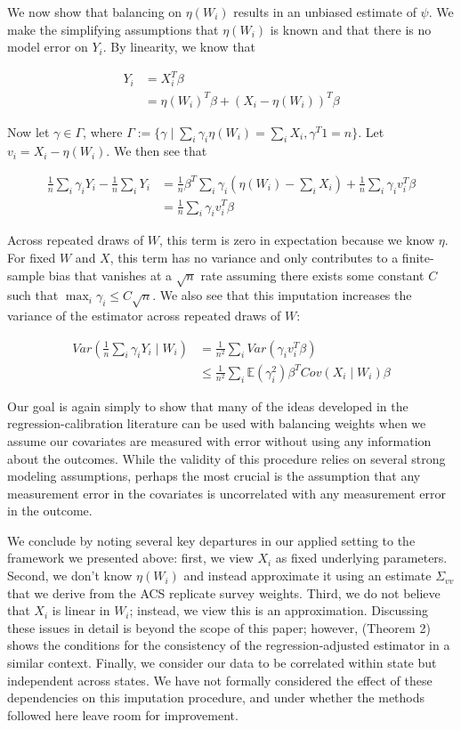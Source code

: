 \documentclass[12pt]{article}
\begin{document}
We now show that balancing on $\eta(W_i)$ results in an unbiased estimate of $\psi$. We make the simplifying assumptions that $\eta(W_i)$ is known and that there is no model error on $Y_i$. By linearity, we know that

\begin{align*}
Y_i &= X_i^T\beta \\
&= \eta(W_i)^T\beta + (X_i - \eta(W_i))^T\beta
\end{align*}

Now let $\gamma \in \Gamma$, where $\Gamma := \{\gamma \mid \sum_i \gamma_i \eta(W_i) = \sum_i X_i, \gamma^T1 = n\}$. Let $v_i = X_i - \eta(W_i)$. We then see that

\begin{align*}
    \frac{1}{n}\sum_{i}\gamma_{i}Y_{i} - \frac{1}{n}\sum_{i}Y_{i} &= \frac{1}{n}\beta^T\sum_{i}\gamma_{i}(\eta(W_i) - \sum_{i}X_{i}) + \frac{1}{n}\sum_i \gamma_iv_i^T\beta \\
    &= \frac{1}{n}\sum_i \gamma_iv_i^T\beta
\end{align*}

Across repeated draws of $W$, this term is zero in expectation because we know $\eta$. For fixed $W$ and $X$, this term has no variance and only contributes to a finite-sample bias that vanishes at a $\sqrt{n}$ rate assuming there exists some constant $C$ such that $\max_i \gamma_i \le C\sqrt{n}$. We also see that this imputation increases the variance of the estimator across repeated draws of $W$:

\begin{align*}
    Var(\frac{1}{n}\sum_i \gamma_i Y_i \mid W_i) &= \frac{1}{n^2}\sum_i Var(\gamma_iv_i^T\beta) \\
    &\le \frac{1}{n^2}\sum_i\mathbb{E}(\gamma_i^2)\beta^TCov(X_i \mid W_i)\beta 
\end{align*}

Our goal is again simply to show that many of the ideas developed in the regression-calibration literature can be used with balancing weights when we assume our covariates are measured with error without using any information about the outcomes. While the validity of this procedure relies on several strong modeling assumptions, perhaps the most crucial is the assumption that any measurement error in the covariates is uncorrelated with any measurement error in the outcome. 

We conclude by noting several key departures in our applied setting to the framework we presented above: first, we view $X_i$ as fixed underlying parameters. Second, we don't know $\eta(W_i)$ and instead approximate it using an estimate $\Sigma_{vv}$ that we derive from the ACS replicate survey weights. Third, we do not believe that $X_i$ is linear in $W_i$; instead, we view this is an approximation. Discussing these issues in detail is beyond the scope of this paper; however, \cite{gleser1992importance} (Theorem 2) shows the conditions for the consistency of the regression-adjusted estimator in a similar context. Finally, we consider our data to be correlated within state but independent across states. We have not formally considered the effect of these dependencies on this imputation procedure, and under whether the methods followed here leave room for improvement. 
\end{document}
